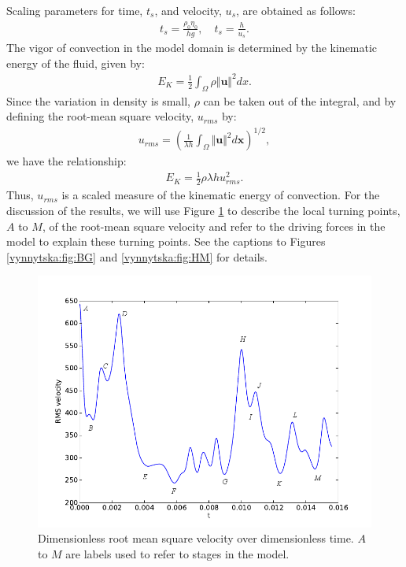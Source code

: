 Scaling parameters for time, $t_s$, and velocity, $u_s$, are obtained
as follows:
\begin{align}
 \label{vynnytska:eq:velsc}
 t_s = \frac{\rho_0 \eta_0}{h g}, \quad t_s = \frac{h}{u_s}.
\end{align}
The vigor of convection in the model domain is determined by the
kinematic energy of the fluid, given by:
\begin{align}
\label{vynnytska:eq:KE}
E_{K} = \frac{1}{2}\int_{\Omega}\rho \Vert \bm{u} \Vert^{2}dx.
\end{align}
Since the variation in density is small, $\rho$ can be taken out of
the integral, and by defining the root-mean square velocity, $u_{rms}$
by:
\begin{align}
\label{vynnytska:eq:u_rms}
u_{rms} =\left( \frac{1}{\lambda h} \int_{\Omega} \Vert \bm{u} \Vert^{2} d\bm{x}  \right)^{1/2},
\end{align}
we have the relationship:
\begin{align}
  \label{vynnytska:eq:KEu_rms}
  E_{K} = \frac{1}{2} \rho \lambda h u_{rms}^{2}.
\end{align}
Thus, $u_{rms}$ is a scaled measure of the kinematic energy of
convection. For the discussion of the results, we will use Figure
\ref{vynnytska:fig:rms_velocity} to describe the local turning points,
$A$ to $M$, of the root-mean square velocity and refer to the driving
forces in the model to explain these turning points. See the captions
to Figures \ref{vynnytska:fig:BG} and \ref{vynnytska:fig:HM} for
details.


\begin{figure}[htbp]
  \begin{center}
   \includegraphics[width=0.95\columnwidth]{chapters/vynnytska/figures/rms_velocity.png}
    \caption{Dimensionless root mean square velocity over
    dimensionless time. $A$ to $M$ are labels used to refer to stages
    in the model.}
  \end{center}
\label{vynnytska:fig:rms_velocity}
\end{figure}

